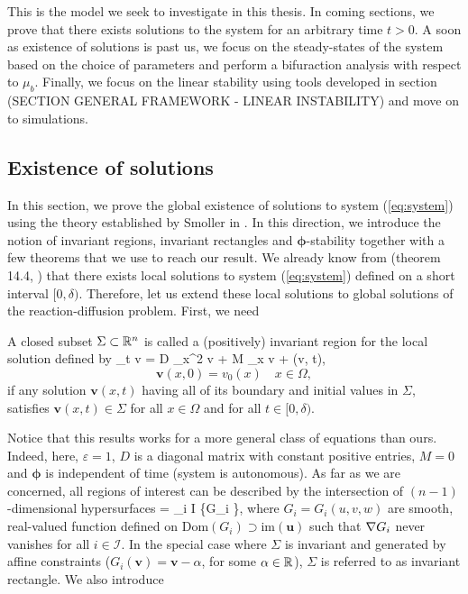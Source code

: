 This is the model we seek to investigate in this thesis. In coming sections, we prove that there exists solutions to the system for an arbitrary time $t>0$. A soon as existence of solutions is past us, we focus on the steady-states of the system based on the choice of parameters and perform a bifuraction analysis with respect to $\mu_b$. Finally, we focus on the linear stability using tools developed in section (SECTION GENERAL FRAMEWORK - LINEAR INSTABILITY) and move on to simulations.

\subsection{Existence of solutions}


In this section, we prove the global existence of solutions to system (\ref{eq:system}) using the theory established by Smoller in \cite{Smoller1994}. In this direction, we introduce the notion of invariant regions, invariant rectangles and $\bm\phi$-stability together with a few theorems that we use to reach our result. We already know from (theorem 14.4, \cite{Smoller1994}) that there exists local solutions to system (\ref{eq:system}) defined on a short interval $[0, \delta)$. Therefore, let us extend these local solutions to global solutions of the reaction-diffusion problem. First, we need

\begin{definition}
	A closed subset $\Sigma \subset \mathbb{R}^n$ is called a (positively) invariant region for the local solution defined by 
	\be\label{eq:smoller_sys}\del_t \bm v = \varepsilon D \del_x^2 \bm v + M \del_x v + \bm \phi(v, t),\ee
	$$\bm v(x, 0) = v_0(x) \quad x\in\Omega,$$ 
	if any solution $\bm v(x, t)$ having all of its boundary and initial values in $\Sigma$, satisfies $\bm v(x, t) \in \Sigma$ for all $x\in\Omega$ and for all $t \in [0, \delta)$.
\end{definition}  

Notice that this results works for a more general class of equations than ours. Indeed, here, $\varepsilon = 1$, $D$ is a diagonal matrix with constant positive entries, $M=0$ and $\bm \phi$ is independent of time (system is autonomous). As far as we are concerned, all regions of interest can be described by the intersection of $(n-1)$-dimensional hypersurfaces 
\be\label{eq:sigma}\Sigma = \bigcap_{i \in \mathcal I} \{G_i  \},\ee
 where $G_i = G_i(u, v, w)$ are smooth, real-valued function defined on $\mathrm{Dom}(G_i) \supset \mathrm{im}(\bm u)$ such that $\nabla G_i$ never vanishes for all $i \in \mathcal I$. In the special case where $\Sigma$ is invariant and generated by affine constraints ($G_i(\bm v) = \bm v - \alpha$, for some $\alpha \in \mathbb{R}$), $\Sigma$ is referred to as invariant rectangle. We also introduce


